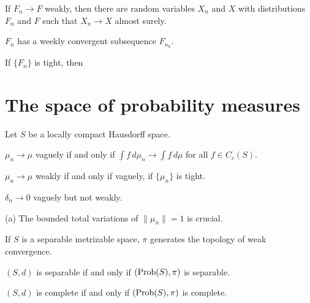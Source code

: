 \documentclass{../note}
\begin{document}
\begin{prb}
\begin{parts}
\item If $F_n\to F$ weakly, then there are random variables $X_n$ and $X$ with distributions $F_n$ and $F$ such that $X_n\to X$ almost surely.
\end{parts}
\end{prb}

\begin{prb}
\begin{parts}
\item
\end{parts}
\end{prb}

\begin{prb}
\begin{parts}
\item 
\item $F_n$ has a weekly convergent subsequence $F_{n_k}$.
\item If $\{F_n\}$ is tight, then
\end{parts}
\end{prb}


\section{The space of probability measures}
\begin{prb}
Let $S$ be a locally compact Hausdorff space.
\begin{parts}
\item $\mu_n\to\mu$ vaguely if and only if $\int f\,d\mu_n\to\int f\,d\mu$ for all $f\in C_c(S)$.
\item $\mu_n\to\mu$ weakly if and only if vaguely, if $\{\mu_n\}$ is tight.
\item $\delta_n\to0$ vaguely but not weakly.
\end{parts}
\end{prb}
\begin{pf}
(a) The bounded total variations of $\|\mu_n\|=1$ is crucial.
\end{pf}

\begin{prb}
\begin{parts}
\item If $S$ is a separable metrizable space, $\pi$ generates the topology of weak convergence.
\item $(S,d)$ is separable if and only if $(\operatorname{Prob}(S),\pi)$ is separable.
\item $(S,d)$ is complete if and only if $(\operatorname{Prob}(S),\pi)$ is complete.
\end{parts}
\end{prb}
\end{document}
